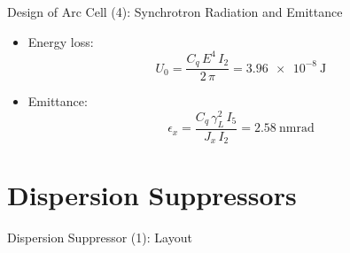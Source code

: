 \documentclass{beamer}
\begin{document}
%
%

\begin{frame}[t]{Design of Arc Cell (4): Synchrotron Radiation and Emittance}
\begin{itemize}
\item Energy loss:
\begin{equation*}
U_0 = \frac{C_q\,E^4\,I_2}{2\,\pi}=\SI{3.96e-8}{\joule}
\end{equation*}
\item Emittance:
\begin{equation*}
\epsilon_x = \frac{C_q\,\gamma_L^2\,I_5}{J_x\,I_2}=\SI{2.58}{\nano\meter\radian}
\end{equation*}
\end{itemize}
\end{frame}





\section{Dispersion Suppressors}
\begin{frame}[t]{Dispersion Suppressor (1): Layout}
\begin{figure}
  \centering
  \\
\end{figure}
\end{frame}
\end{document}
